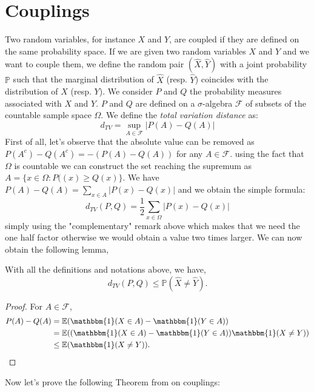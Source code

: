 \section{Couplings}
Two random variables, for instance $X$ and $Y$, are coupled if they are defined on the same probability space.
If we are given two random variables $X$ and $Y$ and we want to couple them, we define the random pair $(\hat{X}, \hat{Y})$ with a joint probability $\mathbb{P}$ 
such that the marginal distribution of $\hat{X}$ (resp. $\hat{Y}$) coincides with the distribution of $X$ (resp. $Y$).
We consider $P$ and $Q$ the probability measures associated with $X$ and $Y$.
$P$ and $Q$ are defined on a $\sigma$-algebra $\mathcal{F}$ of subsets of the countable sample space $\Omega$.
We define the \emph{total variation distance} as:
\begin{equation}
	d_{TV} = \sup_{A \in \mathcal{F}} |P(A) - Q(A)|
\end{equation}
First of all, let's observe that the absolute value can be removed as $P(A^c) - Q(A^c) = -(P(A) - Q(A))$ for any $A \in \mathcal{F}$.
using the fact that $\Omega$ is countable we can construct the set reaching the supremum as $A = \{x\in \Omega: P((x) \geq Q(x)\}$.
We have $P(A) - Q(A) = \sum_{x \in A} |P(x) - Q(x)|$
and we obtain the simple formula:
\begin{equation}
	d_{TV}(P, Q) = \frac{1}{2} \sum_{x \in \Omega} |P(x) - Q(x)|
\end{equation}
simply using the "complementary" remark above which makes that we need the one half factor otherwise we would obtain a value two times larger.
We can now obtain the following lemma,
\begin{lemma}\label{th:coupIneq}
	With all the definitions and notations above, we have,
	\begin{equation}
		d_{TV}(P, Q) \leq \mathbb{P}(\hat{X} \neq \hat{Y}).
	\end{equation}
\end{lemma}
\begin{proof}
	For $A \in \mathcal{F}$, 
	\begin{align}
		P(A) - Q(A) &= \mathbb{E}(\mathbbm{1}(X\in A)- \mathbbm{1}(Y\in A)) \\
				   &= \mathbb{E}((\mathbbm{1}(X\in A)- \mathbbm{1}(Y\in A))\mathbbm{1}(X \neq Y))\\ 
		     &\leq \mathbb{E}(\mathbbm{1}(X \neq Y)).
	\end{align}
\end{proof}
Now let's prove the following Theorem from \cite{Hofstad16} on couplings:
